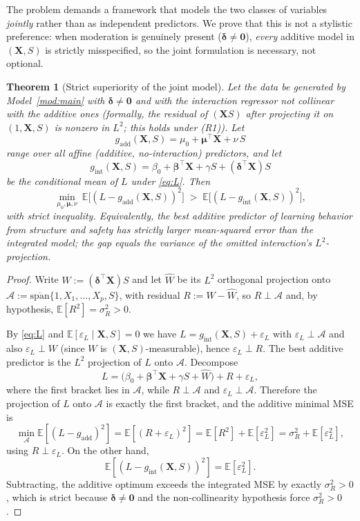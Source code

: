 \documentclass{amsart}
\theoremstyle{definition}
\theoremstyle{plain}
\newtheorem{theorem}{Theorem}
\begin{document}
The problem demands a framework that models the two classes of variables \emph{jointly}
rather than as independent predictors. We prove that this is not a stylistic preference: when
moderation is genuinely present ($\bm\delta\neq\bm0$), \emph{every} additive model in
$(\bm X,S)$ is strictly misspecified, so the joint formulation is necessary, not optional.

\begin{theorem}[Strict superiority of the joint model]\label{thm:nonred}
Let the data be generated by Model~\ref{mod:main} with $\bm\delta\neq\bm0$ and with the
interaction regressor not collinear with the additive ones (formally, the residual of
$(\bm X S)$ after projecting it on $(1,\bm X,S)$ is nonzero in $L^2$; this holds under (R1)).
Let
\[
g_{\mathrm{add}}(\bm X,S)=\mu_0+\bm\mu^\top\bm X+\nu\,S
\]
range over all affine (additive, no-interaction) predictors, and let
\[
g_{\mathrm{int}}(\bm X,S)=\beta_0+\bm\beta^\top\bm X+\gamma S+(\bm\delta^\top\bm X)S
\]
be the conditional mean of $L$ under \eqref{eq:L}. Then
\[
\min_{\mu_0,\bm\mu,\nu}\ \mathbb E\bigl[(L-g_{\mathrm{add}}(\bm X,S))^2\bigr]
\;>\;
\mathbb E\bigl[(L-g_{\mathrm{int}}(\bm X,S))^2\bigr],
\]
with strict inequality. Equivalently, the best additive predictor of learning behavior from
structure and safety has strictly larger mean-squared error than the integrated model; the
gap equals the variance of the omitted interaction's $L^2$-projection.
\end{theorem}

\begin{proof}
Write $W:=(\bm\delta^\top\bm X)S$ and let $\hat W$ be its $L^2$ orthogonal projection onto
$\mathcal A:=\overline{\mathrm{span}}\{1,X_1,\dots,X_p,S\}$, with residual
$R:=W-\hat W$, so $R\perp\mathcal A$ and, by hypothesis, $\mathbb E[R^2]=\sigma_R^2>0$.

By \eqref{eq:L} and $\mathbb E[\varepsilon_L\mid\bm X,S]=0$ we have
$L=g_{\mathrm{int}}(\bm X,S)+\varepsilon_L$ with $\varepsilon_L\perp\mathcal A$ and also
$\varepsilon_L\perp W$ (since $W$ is $(\bm X,S)$-measurable), hence
$\varepsilon_L\perp R$. The best additive predictor is the $L^2$ projection of $L$ onto
$\mathcal A$. Decompose
\[
L=\bigl(\beta_0+\bm\beta^\top\bm X+\gamma S+\hat W\bigr)+R+\varepsilon_L,
\]
where the first bracket lies in $\mathcal A$, while $R\perp\mathcal A$ and
$\varepsilon_L\perp\mathcal A$. Therefore the projection of $L$ onto $\mathcal A$ is exactly
the first bracket, and the additive minimal MSE is
\[
\min_{\mathcal A}\mathbb E[(L-g_{\mathrm{add}})^2]
=\mathbb E[(R+\varepsilon_L)^2]
=\mathbb E[R^2]+\mathbb E[\varepsilon_L^2]
=\sigma_R^2+\mathbb E[\varepsilon_L^2],
\]
using $R\perp\varepsilon_L$. On the other hand,
\[
\mathbb E[(L-g_{\mathrm{int}}(\bm X,S))^2]=\mathbb E[\varepsilon_L^2].
\]
Subtracting, the additive optimum exceeds the integrated MSE by exactly
$\sigma_R^2>0$, which is strict because $\bm\delta\neq\bm0$ and the non-collinearity
hypothesis force $\sigma_R^2>0$.
\end{proof}
\end{document}

